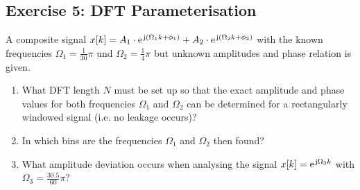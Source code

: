 \documentclass[11pt,a4paper,DIV=12]{scrartcl}
\begin{document}
\subsection*{Exercise 5: DFT Parameterisation}
A composite signal
$x[k]=A_1\cdot\e^{\im(\Omega_1 k+\phi_1)}+A_2\cdot\e^{\im(\Omega_2 k+\phi_2)}$
with the known frequencies $\Omega_1=\frac{1}{30}\pi$ und $\Omega_2=\frac{1}{4}\pi$
but unknown amplitudes and phase relation is given.
%
\begin{enumerate}[label=\alph*)]
	\item What DFT length $N$ must be set up so that the exact amplitude and
	phase values for both frequencies $\Omega_1$ and $\Omega_2$ can be determined
	for a rectangularly windowed signal (i.e. no leakage occurs)?
%
	\item In which bins are the frequencies $\Omega_1$ and $\Omega_2$ then found?
%
	\item What amplitude deviation occurs when analysing the signal
	$x[k]=\e^{\im\Omega_3k}$ with $\Omega_3=\frac{30.5}{60}\pi$?
\end{enumerate}
\end{document}

